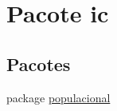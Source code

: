\hypertarget{namespaceic}{\section{Pacote ic}
\label{namespaceic}
}
\subsection*{Pacotes}
\begin{DoxyCompactItemize}
\item 
package \hyperlink{namespaceic_1_1populacional}{populacional}
\end{DoxyCompactItemize}
